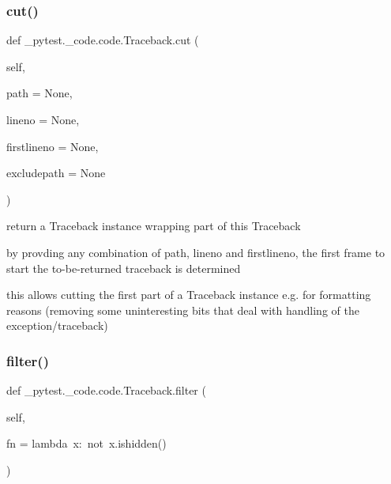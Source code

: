 \subsubsection{\texorpdfstring{cut()}{cut()}}
{\footnotesize\ttfamily def \+\_\+pytest.\+\_\+code.\+code.\+Traceback.\+cut (\begin{DoxyParamCaption}\item[{}]{self,  }\item[{}]{path = {\ttfamily None},  }\item[{}]{lineno = {\ttfamily None},  }\item[{}]{firstlineno = {\ttfamily None},  }\item[{}]{excludepath = {\ttfamily None} }\end{DoxyParamCaption})}

\begin{DoxyVerb}return a Traceback instance wrapping part of this Traceback

    by provding any combination of path, lineno and firstlineno, the
    first frame to start the to-be-returned traceback is determined

    this allows cutting the first part of a Traceback instance e.g.
    for formatting reasons (removing some uninteresting bits that deal
    with handling of the exception/traceback)
\end{DoxyVerb}
 \mbox{\label{class__pytest_1_1__code_1_1code_1_1_traceback_a60858123598ead711a5b6ca046a21c0a}} 
\subsubsection{\texorpdfstring{filter()}{filter()}}
{\footnotesize\ttfamily def \+\_\+pytest.\+\_\+code.\+code.\+Traceback.\+filter (\begin{DoxyParamCaption}\item[{}]{self,  }\item[{}]{fn = {\ttfamily lambda~x\+:~not~x.ishidden()} }\end{DoxyParamCaption})}


